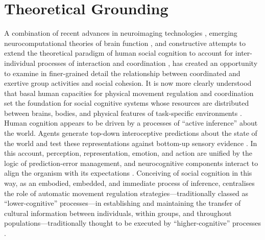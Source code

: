 

\section{Theoretical Grounding}
A combination of recent advances in neuroimaging technologies \citep{Frith2007}, emerging neurocomputational theories of brain function \citep{Friston2010,Frith2010,Clark2013}, and constructive attempts to extend the theoretical paradigm of human social cognition to account for inter-individual processes of interaction and coordination \citep{Sebanz2006,Dale2014}, has created an opportunity to examine in finer-grained detail the relationship between coordinated and exertive group activities and social cohesion.  It is now more clearly understood that basal human capacities for physical movement regulation and coordination set the foundation for social cognitive systems whose resources are distributed between brains, bodies, and physical features of task-specific environments \citep{Hutchins2000,Kirsh2006,Semin2008,Semin2012,Coey2012}.
Human cognition appears to be driven by a processes of ``active inference'' \citep{Friston2010} about the world.  Agents generate top-down interoceptive predictions about the state of the world and test these representations against bottom-up sensory evidence \citep{Clark2013}.  In this account, perception, representation, emotion, and action are unified by the logic of prediction-error management, and neurocognitive components interact to align the organism with its expectations \citep{Pezzulo2014}.  Conceiving of social cognition in this way, as an embodied, embedded, and immediate process of inference, centralises the role of automatic movement regulation strategies---traditionally classed as ``lower-cognitive'' processes---in establishing and maintaining the transfer of cultural information between individuals, within groups, and throughout populations---traditionally thought to be executed by  ``higher-cognitive'' processes \citep{Claidiere2014}.

